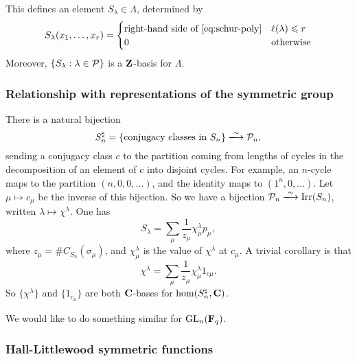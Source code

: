 This defines an element $S_\lambda\in \Lambda$, determined by 
\[
  S_\lambda(x_1,\dots,x_r) = \begin{cases} \text{right-hand side of \eqref{eq:schur-poly}} & \ell(\lambda) \leqslant r \\ 0 & \text{otherwise} \end{cases}
\]
Moreover, $\{S_\lambda:\lambda\in \mathcal{P}\}$ is a $\mathbf{Z}$-basis for $\Lambda$. 


\subsubsection{Relationship with representations of the symmetric group}

There is a natural bijection 
\[
  S_n^\natural = \{\text{conjugacy classes in }S_n\} \isomorphism \cP_n ,
\]
sending a conjugacy class $c$ to the partition coming from lengths of cycles in 
the decomposition of an element of $c$ into disjoint cycles. For example, an 
$n$-cycle maps to the partition $(n,0,0,\dots)$, and the identity maps to 
$(1^n,0,\dots)$. Let $\mu\mapsto c_\mu$ be the inverse of this bijection. 
So we have a bijection $\cP_n \isomorphism \irreducible(S_n)$, 
written $\lambda\mapsto \chi^\lambda$. One has 
\[
  S_\lambda = \sum_\mu \frac{1}{z_\mu} \chi_\mu^\lambda p_\mu , 
\]
where $z_\mu = \# C_{S_n}(\sigma_\mu)$, and 
$\chi_\mu^\lambda$ is the value of $\chi^\lambda$ at $c_\mu$. A trivial 
corollary is that 
\[
  \chi^\lambda = \sum_\mu \frac{1}{z_\mu} \chi_\mu^\lambda 1_{c\mu} .
\]
So $\{\chi^\lambda\}$ and $\{1_{c_\mu}\}$ are both $\mathbf{C}$-bases for 
$\hom(S_n^\natural,\mathbf{C})$. 

We would like to do something similar for $\operatorname{GL}_n(\mathbf{F}_q)$. 


\subsubsection{Hall-Littlewood symmetric functions}


